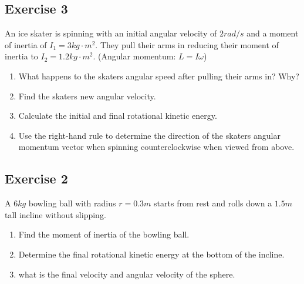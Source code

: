 \documentclass[11pt]{article}
\newenvironment{exercise}{
    \begin{mdframed}[style=problemstyle]\textcolor{black}{}
}{
    \end{mdframed}
}
\begin{document}
\subsection*{Exercise 3}
\begin{exercise}
    An ice skater is spinning with an initial angular velocity of $2rad/s$
    and a moment of inertia of $I_1 = 3 kg\cdot m^2$. They pull their arms 
    in reducing their moment of inertia to $I_2 = 1.2 kg\cdot m^2$.
    (Angular momentum: $L=I\omega$)
    \begin{enumerate}[label=(\alph*)]
        \item What happens to the skaters angular speed after pulling 
            their arms in? Why?
        \item Find the skaters new angular velocity. 
        \item Calculate the initial and final rotational kinetic energy.
        \item Use the right-hand rule to determine the direction of the 
            skaters angular momentum vector when spinning counterclockwise
            when viewed from above.
    \end{enumerate}
\end{exercise}

\subsection*{Exercise 2}
\begin{exercise}
    A $6kg$ bowling ball with radius $r=0.3m$ starts from rest and rolls
    down a $1.5m$ tall incline without slipping.
    \begin{enumerate}[label=(\alph*)]
        \item Find the moment of inertia of the bowling ball.
        \item Determine the final rotational kinetic energy at the 
            bottom of the incline.
        \item what is the final velocity and angular velocity of the sphere.
    \end{enumerate}
\end{exercise}
\end{document}
